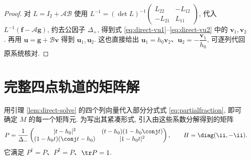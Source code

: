 \begin{proof}
对 $L=I_2+\mathcal A\mathcal B$ 使用
$L^{-1}=(\det L)^{-1}\left(\begin{smallmatrix}L_{22}&-L_{12}\\-L_{21}&L_{11}\end{smallmatrix}\right)$, 代入 $L^{-1}(\boldsymbol f-\mathcal A\boldsymbol g)$, 约去公因子 $\Delta_+$, 得到式 \eqref{eq:direct-vu1}--\eqref{eq:direct-vu2} 中的 $\mathbf v_1,\mathbf v_2$. 再用 $\boldsymbol u=\boldsymbol g+\mathcal B\boldsymbol v$ 得到 $\mathbf u_1,\mathbf u_2$. 这也直接给出 $\mathbf u_1=h_0\mathbf v_2$、$\mathbf u_2=-\dfrac{\mathbf v_1}{h_0}$, 可逐列代回原系统核对.
\end{proof}

\section{完整四点轨道的矩阵解}
用引理 \ref{lem:direct-solve} 的四个列向量代入部分分式式 \eqref{eq:partialfraction}, 即可确定 $M$ 的每一个矩阵元. 为写出其紧凑形式, 引入由这些系数分解得到的矩阵
\begin{equation}\label{eq:algebraic-P}
P=\dfrac{1}{\Delta_-}
\begin{pmatrix}
|t-h_0|^2&(t-h_0)(1-h_0\conj t)\\
(1-h_0t)(\conj t-h_0)&|1-h_0t|^2
\end{pmatrix},\qquad H=\diag(\ii,-\ii).
\end{equation}
它满足 $P^\dagger=P$、$P^2=P$、$\tr P=1$.

